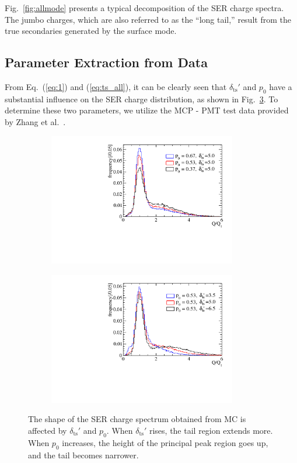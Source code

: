 Fig.~\ref{fig:allmode} presents a typical decomposition of the SER charge spectra. The jumbo charges, which are also referred to as the “long tail,” result from the true secondaries generated by the surface mode.

\subsection{Parameter Extraction from Data}\label{subsec:chitest}
From Eq.~(\ref{eq:1}) and (\ref{eq:ts_all}), it can be clearly seen that $\delta_{\mathrm{ts}}'$ and \(p_0\) have a substantial influence on the SER charge distribution, as shown in Fig.~\ref{fig:tsp}. To determine these two parameters, we utilize the MCP - PMT test data provided by Zhang et al.~\cite{Zhang:2023ued}.
\begin{figure}[htbp]
	\centering
	\begin{subfigure}{0.5\textwidth}
		\centering
		\includegraphics[width=0.9\textwidth]{PMTRelated/GTmodel/p.pdf}
		\caption{}
		\label{fig:p}
	\end{subfigure}%
	\hfill
	\begin{subfigure}{0.5\textwidth}
		\centering
		\includegraphics[width=0.9\textwidth]{PMTRelated/GTmodel/ts.pdf}
		\caption{}
		\label{fig:ts}
	\end{subfigure}
	\caption{The shape of the SER charge spectrum obtained from MC is affected by $\delta_{\mathrm{ts}}'$ and $p_0$. When $\delta_{\mathrm{ts}}'$ rises, the tail region extends more. When $p_0$ increases, the height of the principal peak region goes up, and the tail becomes  narrower.
	}
	\label{fig:tsp}
\end{figure}

